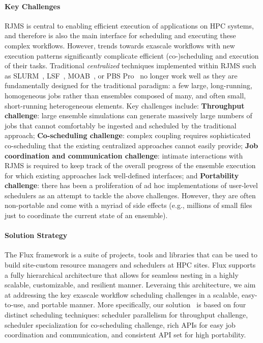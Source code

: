 \paragraph{Key  Challenges}
RJMS is central to enabling efficient execution of applications on HPC systems,
and therefore is also the main interface for scheduling
and executing these complex workflows.
%
However, trends towards exascale workflows with new execution patterns
significantly complicate efficient (co-)scheduling and execution of
their tasks.
%
Traditional \emph{centralized} techniques implemented within RJMS
such as SLURM~\cite{SLURM}, LSF~\cite{LSF}, MOAB~\cite{MOAB}, or
PBS Pro~\cite{PBSPro} no longer work well as they are
fundamentally designed for the traditional paradigm: a few large,
long-running, homogeneous jobs rather than ensembles composed of
many, and often small, short-running heterogeneous elements.
%
%
Key challenges include:
{\bf Throughput challenge}:
      large ensemble simulations can generate massively large numbers
      of jobs that cannot comfortably be ingested and scheduled
      by the traditional approach;
{\bf Co-scheduling challenge}: complex coupling requires
      sophisticated co-scheduling that the existing centralized approaches
      cannot easily provide;
{\bf Job coordination and communication challenge}:
      intimate interactions with RJMS is required to keep
      track of the overall progress of the ensemble execution for which existing
      approaches lack well-defined interfaces;
and {\bf Portability challenge}:
      there has been a proliferation of ad hoc implementations
      of user-level schedulers as an attempt to tackle the
      above challenges. However, they are often non-portable
      and come with a myriad of side effects (e.g., millions
      of small files just to coordinate the current state of an ensemble).


\paragraph{Solution Strategy}
The Flux framework is a suite of projects, tools and libraries that can be used
to build site-custom resource managers and schedulers at HPC sites.
Flux supports a fully hierarchical architecture that allows for seamless nesting
in a highly scalable, customizable, and resilient manner.
Leveraing this architecture,
we aim at addressing the key exascale workflow scheduling challenges
in a scalable, easy-to-use, and portable manner. More specifically,
our solution~\cite{FluxSC18} is based on four distinct scheduling
techniques:
scheduler parallelism for throughput challenge,
scheduler specialization for co-scheduling challenge,
rich APIs for easy job coordination and communication,
and consistent API set for high portability.

